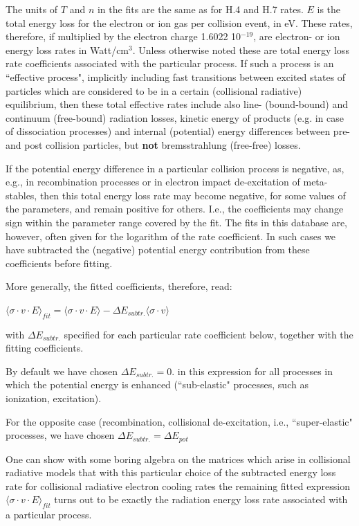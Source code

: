 \documentclass[12pt,dvips]{article}
\begin{document}
The units of $T$ and $n$ in the fits are the same as for H.4 and H.7
rates. $E$ is the total energy loss for the electron or ion gas per
collision event, in eV. These rates, therefore, if multiplied by the
electron charge 1.6022 10$^{-19}$, are electron- or ion energy loss
rates in Watt/cm$^3$. Unless otherwise noted these are total energy
loss rate coefficients associated with the particular process. If
such a process is an ``effective process", implicitly including fast
transitions between excited states of particles which are considered
to be in a certain (collisional radiative) equilibrium, then these
total effective rates include also line- (bound-bound) and continuum
(free-bound) radiation losses, kinetic energy of products (e.g. in
case of dissociation processes) and internal (potential) energy
differences between pre- and post collision particles, but {\bf not}
bremsstrahlung (free-free) losses.

If the potential energy difference in a particular collision process
is negative, as, e.g., in recombination processes
or in electron impact de-excitation of meta-stables,
then this total energy loss rate
may become negative, for some values of the parameters,
and remain positive for others.
I.e., the coefficients may change sign within the parameter
range covered by the fit.
The fits in this database are, however, often given for the logarithm of the
rate coefficient. In such cases we have subtracted the (negative) potential energy
contribution from these coefficients before fitting.

More generally, the fitted coefficients, therefore, read:

$\langle\sigma \cdot v \cdot E \rangle_{fit} = \langle\sigma \cdot v \cdot E \rangle - \Delta E_{subtr.} \langle\sigma \cdot v \rangle$

with $\Delta E_{subtr.} $ specified for each particular rate coefficient below, together
with the fitting coefficients.

By default we have chosen $\Delta E_{subtr.} = 0.$ in this expression
for all processes in which the potential energy is
enhanced (``sub-elastic" processes, such as ionization, excitation).

For the opposite case (recombination, collisional de-excitation, i.e., ``super-elastic"
processes, we have chosen $\Delta E_{subtr.} = \Delta E_{pot}$

One can show with some boring algebra on the matrices which arise in collisional radiative
models that
with this particular choice of the subtracted energy loss rate for collisional radiative
electron cooling rates
the remaining fitted expression $\langle\sigma \cdot v \cdot E \rangle_{fit}$
turns out to be exactly the radiation energy loss rate
associated with a particular process.
\end{document}
